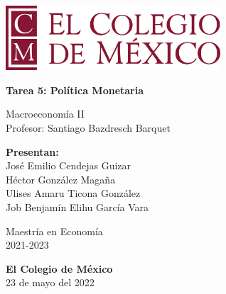 \begin{titlepage}
   \begin{center}
       \vspace*{1cm}
      
        \includegraphics[width=0.6\textwidth]{COLMEX.png}
        
        \vspace*{1cm}

       \textbf{Tarea 5: Política Monetaria}

       \vspace{0.5cm}
        Macroeconomía II \\
        \vspace{0.5cm}
        Profesor: Santiago Bazdresch Barquet
            
       \vspace{1.5cm}

       \textbf{Presentan:} \\
       \vspace{0.5cm}
       José Emilio Cendejas Guizar\\ 
       Héctor González Magaña\\ 
       Ulises Amaru Ticona González\\
       Job Benjamín Elihu García Vara 
       
       

       \vspace{3cm}
            
       Maestría en Economía\\
       2021-2023
            
       \vspace{0.8cm}
     
            
       \textbf{El Colegio de México}\\
       23 de mayo del 2022
            
   \end{center}
\end{titlepage}